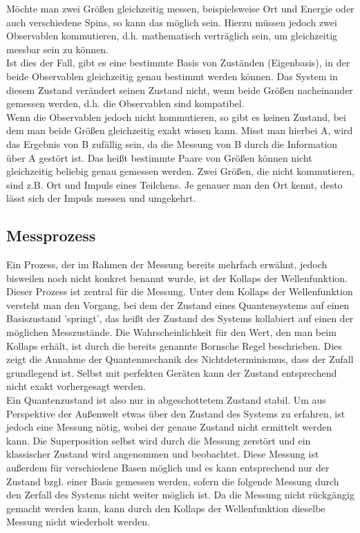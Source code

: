 Möchte man zwei Größen gleichzeitig messen, beispielsweise Ort und Energie oder auch verschiedene Spins, so kann das möglich sein. Hierzu müssen jedoch zwei Observablen kommutieren, d.h. mathematisch verträglich sein, um gleichzeitig messbar sein zu können. \\
Ist dies der Fall, gibt es eine bestimmte Basis von Zuständen (Eigenbasis), in der beide Observablen gleichzeitig genau bestimmt werden können. Das System in diesem Zustand verändert seinen Zustand nicht, wenn beide Größen nacheinander gemessen werden, d.h. die Observablen sind kompatibel. \\
Wenn die Observablen jedoch nicht kommutieren, so gibt es keinen Zustand, bei dem man beide Größen gleichzeitig exakt wissen kann. Misst man hierbei A, wird das Ergebnis von B zufällig sein, da die Messung von B durch die Information über A gestört ist.
Das heißt bestimmte Paare von Größen können nicht gleichzeitig beliebig genau gemessen werden. 
Zwei Größen, die nicht kommutieren, sind z.B. Ort und Impuls eines Teilchens. Je genauer man den Ort kennt, desto lässt sich der Impuls messen und umgekehrt. 
\cite{kasirajan_fundamentals_2021}

\subsection{Messprozess}

Ein Prozess, der im Rahmen der Messung bereits mehrfach erwähnt, jedoch bisweilen noch nicht konkret benannt wurde, ist der Kollaps der Wellenfunktion. Dieser Prozess ist zentral für die Messung. 
Unter dem Kollaps der Wellenfunktion versteht man den Vorgang, bei dem der Zustand eines Quantensystems auf einen Basiszustand 'springt', das heißt der Zustand des Systems kollabiert auf einen der möglichen Messzustände. Die Wahrscheinlichkeit für den Wert, den man beim Kollaps erhält, ist durch die bereits genannte Bornsche Regel beschrieben.
Dies zeigt die Annahme der Quantenmechanik des Nichtdeterminismus, dass der Zufall grundlegend ist. Selbst mit perfekten Geräten kann der Zustand entsprechend nicht exakt vorhergesagt werden. 
\cite{lvovsky_quantum_2018}
\\

Ein Quantenzustand ist also nur in abgeschottetem Zustand stabil. Um aus Perspektive der Außenwelt etwas über den Zustand des Systems zu erfahren, ist jedoch eine Messung nötig, wobei der genaue Zustand nicht ermittelt werden kann.
Die Superposition selbst wird durch die Messung zerstört und ein klassischer Zustand wird angenommen und beobachtet. Diese Messung ist außerdem für verschiedene Basen möglich und es kann entsprechend nur der Zustand bzgl. einer Basis gemessen werden, sofern die folgende Messung durch den Zerfall des Systems nicht weiter möglich ist.
Da die Messung nicht rückgängig gemacht werden kann, kann durch den Kollaps der Wellenfunktion dieselbe Messung nicht wiederholt werden.
\cite{homeister_quantum_2022}
\\

